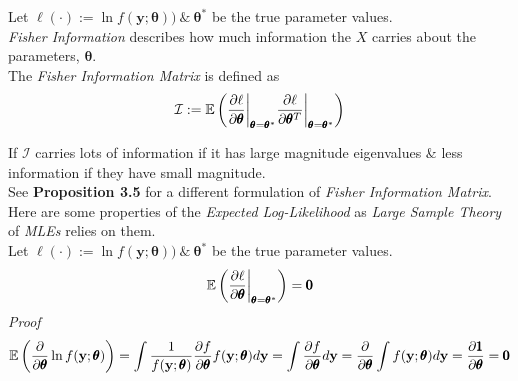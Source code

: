 \documentclass[11pt,a4paper]{article}
\begin{document}

Let $\ell(\cdot):=\ln f(\textbf{y};\pmb\theta))\ \&\ \pmb\theta^*$ be the true parameter values.\\
\textit{Fisher Information} describes how much information the $X$ carries about the parameters, $\pmb\theta$.\\
The \textit{Fisher Information Matrix} is defined as
$$\mathcal{I}:=\mathbb{E}\left(\dfrac{\partial\ell}{\partial\pmb\theta}\bigg|_{\pmb\theta=\pmb\theta^*}\dfrac{\partial\ell}{\partial\pmb\theta^T}\bigg|_{\pmb\theta=\pmb\theta^*}\right)$$

If $\mathcal{I}$ carries lots of information if it has large magnitude eigenvalues \& less information if they have small magnitude.\\
\nb See \textbf{Proposition 3.5} for a different formulation of \textit{Fisher Information Matrix}.\\

Here are some properties of the \textit{Expected Log-Likelihood} as \textit{Large Sample Theory} of \textit{MLEs} relies on them.\\

Let $\ell(\cdot):=\ln f(\textbf{y};\pmb\theta))\ \&\ \pmb\theta^*$ be the true parameter values.
$$\mathbb{E}\left(\dfrac{\partial\ell}{\partial\pmb\theta}\bigg|_{\pmb\theta=\pmb\theta^*}\right)=\pmb0$$
\textit{Proof}
$$\mathbb{E}\left(\dfrac\partial{\partial\pmb\theta}\ln f(\textbf{y};\pmb\theta)\right)=\int\dfrac1{f(\textbf{y};\pmb\theta)}\dfrac{\partial f}{\partial\pmb\theta}f(\textbf{y};\pmb\theta)d\textbf{y}=\int\dfrac{\partial f}{\partial\pmb\theta}d\textbf{y}=\dfrac\partial{\partial\pmb\theta}\int f(\textbf{y};\pmb\theta)d\textbf{y}=\dfrac{\partial\pmb1}{\partial\pmb\theta}=\pmb0$$
\proved
\end{document}
